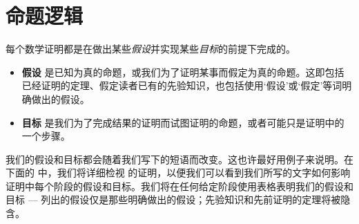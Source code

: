 \section{命题逻辑}

每个数学证明都是在做出某些\textit{假设}并实现某些\textit{目标}的前提下完成的。

\begin{itemize}
\item \textbf{假设 } 是已知为真的命题，或我们为了证明某事而假定为真的命题。这即包括已经证明的定理、假定读者已有的先验知识，也包括使用`假设'或`假定'等词明确做出的假设。
\item \textbf{目标 } 是我们为了完成结果的证明而试图证明的命题，或者可能只是证明中的一个步骤。
\end{itemize}

我们的假设和目标都会随着我们写下的短语而改变。这也许最好用例子来说明。在下面的  中，我们将详细检视  的证明，以便我们可以看到我们所写的文字如何影响证明中每个阶段的假设和目标。我们将在任何给定阶段使用表格表明我们的假设和目标 --- 列出的假设仅是那些明确做出的假设；先验知识和先前证明的定理将被隐含。


